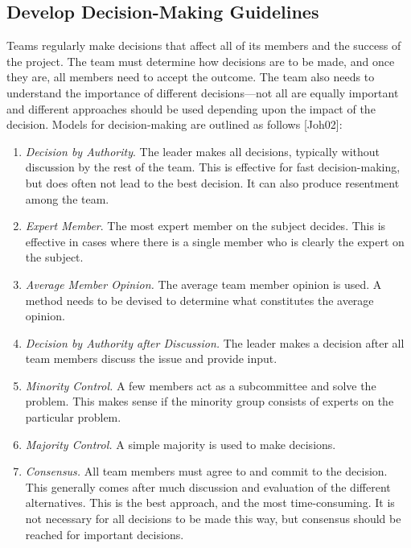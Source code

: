 \subsection{Develop Decision-Making Guidelines}
\label{subsection:develop-decision-making-guidelines}

Teams regularly make decisions that affect all of its members and the
success of the project. The team must determine how decisions are to be
made, and once they are, all members need to accept the outcome. The
team also needs to understand the importance of different
decisions---not all are equally important and different approaches
should be used depending upon the impact of the decision. Models for
decision-making are outlined as follows {[}Joh02{]}:

\begin{enumerate}
\def\labelenumi{\arabic{enumi}.}
\item
  \emph{Decision by Authority}. The leader makes all decisions,
  typically without discussion by the rest of the team. This is
  effective for fast decision-making, but does often not lead to the
  best decision. It can also produce resentment among the team.
\item
  \emph{Expert Member}. The most expert member on the subject decides.
  This is effective in cases where there is a single member who is
  clearly the expert on the subject.
\item
  \emph{Average Member Opinion.} The average team member opinion is
  used. A method needs to be devised to determine what constitutes the
  average opinion.
\item
  \emph{Decision by Authority after Discussion.} The leader makes a
  decision after all team members discuss the issue and provide input.
\item
  \emph{Minority Control.} A few members act as a subcommittee and solve
  the problem. This makes sense if the minority group consists of
  experts on the particular problem.
\item
  \emph{Majority Control.} A simple majority is used to make decisions.
\item
  \emph{Consensus.} All team members must agree to and commit to the
  decision. This generally comes after much discussion and evaluation of
  the different alternatives. This is the best approach, and the most
  time-consuming. It is not necessary for all decisions to be made this
  way, but consensus should be reached for important decisions.
\end{enumerate}

